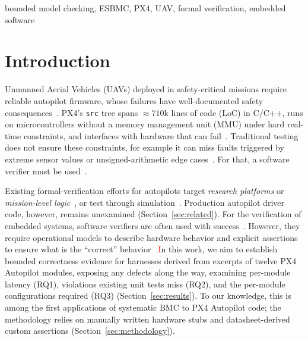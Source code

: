 \documentclass[conference]{IEEEtran}
\newcommand{\entra}[1]{#1}
\begin{document}
\begin{IEEEkeywords}
bounded model checking, ESBMC, PX4, UAV, formal verification, embedded software
\end{IEEEkeywords}


\section{Introduction}
\label{sec:introduction}

\entra{Unmanned Aerial Vehicles (UAVs)} deployed in safety-critical missions
require reliable autopilot
firmware, whose failures have well-documented safety
consequences~\cite{Wanner2024}.
PX4's \texttt{src} tree spans ${\approx}710$k \entra{lines of code (LoC)} in
C/C++, runs on microcontrollers \entra{without a memory management unit
(MMU)} under hard real-time constraints, and interfaces
with hardware that can fail~\cite{PX4_GitHub,Wanner2024}.
Traditional testing does not ensure these constraints, for example it can miss faults triggered by extreme sensor values
or unsigned-arithmetic edge cases~\cite{Khatiri2024}. For that, a software verifier must be used~\cite{Dijkstra1972}.

Existing formal-verification efforts for autopilots target \textit{research
platforms} or \textit{mission-level logic}~\cite{Pollien2023,Bernardeschi2023},
or test through simulation~\cite{Khatiri2024}.
Production autopilot driver code, however, remains unexamined (Section~\ref{sec:related}). For the verification of embedded systems, software verifiers are often used with success~\cite{Sousa2026}. However, they require operational models to
describe hardware behavior and explicit assertions to ensure
what is the ``correct'' behavior\textbf{~\cite{Post2007}}.\textcolor{red}


In this work, we aim to establish bounded correctness evidence for harnesses derived from excerpts of twelve PX4 Autopilot modules, exposing any defects along the way, examining per-module latency (RQ1), violations existing unit tests miss (RQ2), and the per-module configurations required (RQ3)
(Section~\ref{sec:results}). To our knowledge, this is among the first applications of systematic BMC to PX4 Autopilot code; the methodology relies on manually written hardware stubs and datasheet-derived custom assertions (Section~\ref{sec:methodology}).

\end{document}
